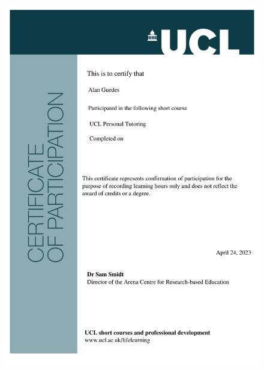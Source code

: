 \documentclass[10pt,a4paper,sans,colorlinks]{moderncv}
\begin{document}
\begin{figure}
    \includegraphics[align=t,width=\textwidth,height=0.3\paperheight, keepaspectratio=true]{certificates/ucl-training/Personal_Tutoring.pdf}

\end{figure}
\end{document}
